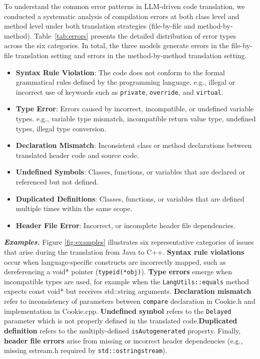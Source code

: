 To understand the common error patterns in LLM-driven code translation, we conducted a systematic analysis of compilation errors at both class level and method level under both translation strategies (file-by-file and method-by-method). Table~\ref{tab:errors} presents the detailed distribution of error types across the six categories. In total, the three models generate  errors in the file-by-file translation setting and  errors in the method-by-method translation setting. 

\begin{itemize}
    \item \textbf{Syntax Rule Violation}: The code does not conform to the formal grammatical rules defined by the programming language. e.g., illegal or incorrect use of keywords such as \texttt{private}, \texttt{override}, and \texttt{virtual}.
    \item \textbf{Type Error}: Errors caused by incorrect, incompatible, or undefined variable types. e.g., variable type mismatch, incompatible return value type, undefined types, illegal type conversion.
    \item \textbf{Declaration Mismatch}: Inconsistent class or method declarations between translated header code and source code. 
    \item \textbf{Undefined Symbols}: Classes, functions, or variables that are declared or referenced but not defined. 
    \item \textbf{Duplicated Definitions}: Classes, functions, or variables that are defined multiple times within the same scope. 
    \item \textbf{Header File Error}: Incorrect, or incomplete header file dependencies.
\end{itemize}


\textbf{\textit{Examples.}} Figure \ref{fig:examples}  illustrates six representative categories of issues that arise during the translation from Java to C++. \textbf{Syntax rule violations} occur when language-specific constructs are incorrectly mapped, such as dereferencing a void* pointer (\texttt{typeid(*obj)}). \textbf{Type errors} emerge when incompatible types are used, for example when the \texttt{LangUtils::equals} method expects const void* but receives std::string arguments. \textbf{Declaration mismatch} refer to inconsistency of parameters between \texttt{compare} declaration in Cookie.h and implementation in Cookie.cpp. \textbf{Undefined symbol} refers to the \texttt{Delayed} parameter which is not properly defined in the translated code.\textbf{Duplicated definition} refers to the multiply-defined \texttt{isAutogenerated} property. Finally, \textbf{header file errors} arise from missing or incorrect header dependencies (e.g., missing sstream.h required by \texttt{std::ostringstream}).




